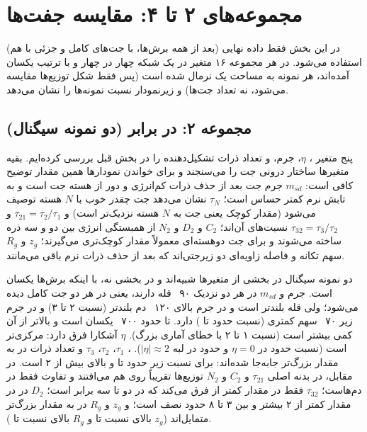 \section{مجموعه‌های ۲ تا ۴: مقایسه جفت‌ها}
\label{sec:sets234}
در این بخش فقط داده نهایی (بعد از همه برش‌ها، با جت‌های کامل و جزئی با هم) استفاده می‌شود. در هر مجموعه ۱۶ متغیر در یک شبکه چهار در چهار و با ترتیب یکسان آمده‌اند، هر نمونه به مساحت یک نرمال شده است (پس فقط شکل توزیع‌ها مقایسه می‌شود، نه تعداد جت‌ها) و زیرنمودار نسبت نمونه‌ها را نشان می‌دهد.

\subsection{مجموعه ۲: {\boldmath\ttZ} در برابر {\boldmath\Zjet} (دو نمونه سیگنال)}
\label{sec:set2}
پنج متغیر \pt، $\eta$، جرم،  و تعداد ذرات تشکیل‌دهنده را در بخش قبل بررسی کرده‌ایم. بقیه متغیرها ساختار درونی جت را می‌سنجند و برای خواندن نمودارها همین مقدار توضیح کافی است: $m_{sd}$ جرم جت بعد از حذف ذرات کم‌انرژی و دور از هسته جت است و به تابش نرم کمتر حساس است؛ $\tau_N$ نشان می‌دهد جت چقدر خوب با $N$ هسته توصیف می‌شود (مقدار کوچک یعنی جت به $N$ هسته نزدیک‌تر است) و $\tau_{21}=\tau_2/\tau_1$ و $\tau_{32}=\tau_3/\tau_2$ نسبت‌های آن‌اند؛ $C_2$ و $D_2$ و $N_2$ از همبستگی انرژی بین دو و سه ذره ساخته می‌شوند و برای جت دو‌هسته‌ای معمولاً مقدار کوچک‌تری می‌گیرند؛ $z_g$ و $R_g$ سهم تکانه و فاصله زاویه‌ای دو زیرجتی‌اند که بعد از حذف ذرات نرم باقی می‌مانند.

دو نمونه سیگنال در بخشی از متغیرها شبیه‌اند و در بخشی نه، با اینکه برش‌ها یکسان است. جرم و $m_{sd}$ در هر دو نزدیک ۹۰~ قله دارند، یعنی در هر دو جت کامل \Zbos{} دیده می‌شود؛ ولی قله \Zjet بلندتر است و \ttZ در جرم بالای ۱۲۰~ دم بلندتر (نسبت ۲ تا ۳) و در جرم زیر ۷۰~ سهم کمتری (نسبت حدود  تا ) دارد. \pt تا حدود ۷۰۰~ یکسان است و بالاتر از آن \ttZ کمی بیشتر است (نسبت ۱ تا ۲ با خطای آماری بزرگ). $\eta$ آشکارا فرق دارد: \ttZ مرکزی‌تر است (نسبت حدود  در $\eta=0$ و حدود  در لبه $|\eta|\approx2$). ، $\tau_1$، $\tau_2$، $\tau_3$ و تعداد ذرات در \ttZ به مقدار بزرگ‌تر جابه‌جا شده‌اند: برای  نسبت زیر  حدود  تا  و بالای  بیش از ۲ است. در مقابل، در بدنه اصلی $\tau_{21}$ و $C_2$ و $N_2$ توزیع‌ها تقریباً روی هم می‌افتند و تفاوت فقط در دم‌هاست؛ $\tau_{32}$ فقط در مقدار کمتر از  فرق می‌کند که در \ttZ دو تا سه برابر است؛ $D_2$ در \ttZ در مقدار کمتر از ۲ بیشتر و بین ۳ تا ۸ حدود نصف است؛ و $z_g$ و $R_g$ در \ttZ به مقدار بزرگ‌تر متمایل‌اند ($z_g$ بالای  نسبت  تا  و $R_g$ بالای  نسبت  تا ).

